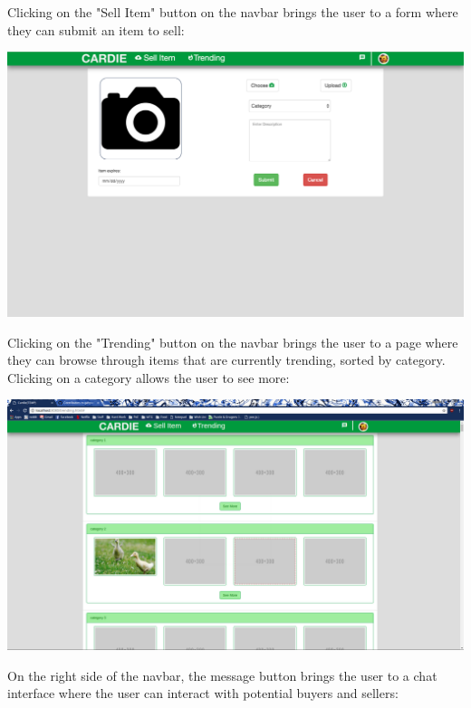 \documentclass[10pt, titlepage]{article}
\begin{document}
\noindent Clicking on the "Sell Item" button on the navbar brings the user to a form where they can submit an item to sell: \\

\centerline{\includegraphics[scale=.25]{screen_07}}


\pagebreak

\noindent Clicking on the "Trending" button on the navbar brings the user to a page where they can browse through items that are currently trending, sorted by category. Clicking on a category allows the user to see more: \\

\centerline{\includegraphics[scale=.25]{screen_05}}

\pagebreak

\noindent On the right side of the navbar, the message button brings the user to a chat interface where the user can interact with potential buyers and sellers: \\
\end{document}
